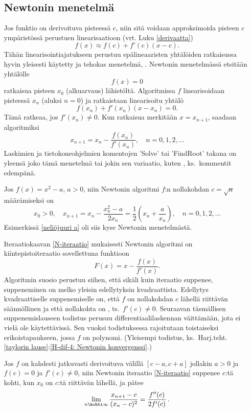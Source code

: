\subsection*{Newtonin menetelmä}

Jos funktio on derivoituva pisteessä $c$, niin sitä voidaan approksimoida pisteen $c$ 
ympäristössä perustuen linearisaatioon (vrt. Luku \ref{derivaatta})
\[
f(x)\approx f(c)+f'(c)(x-c).
\]
Tähän linearisointiajatukseen perustuu epälineaaristen yhtälöiden ratkaisussa hyvin yleisesti 
käytetty ja tehokas menetelmä, . Newtonin menetelmässä etsitään 
yhtälölle
\[
f(x)=0
\]
ratkaisua pisteen $x_0$ (alkuarvaus) lähistöltä. Algoritmissa $f$ linearisoidaan pisteessä $x_n$
(aluksi $n=0$) ja ratkaistaan linearisoitu yhtälö
\[
f(x_n)+f'(x_n)(x-x_n)=0.
\]
Tämä ratkeaa, jos $f'(x_n)\neq 0$. Kun ratkaisua merkitään $x=x_{n+1}$, saadaan algoritmiksi
\begin{equation} \label{N-iteraatio}
\boxed{\quad x_{n+1}=x_n-\frac{f(x_n)}{f'(x_n)},\quad n=0,1,2,\ldots \quad} \tag{$\star\star$}
\end{equation}
Laskimien ja tietokoneohjelmien komentojen 'Solve' tai 'FindRoot' takana on yleensä joko tämä
menetelmä tai jokin sen variaatio, kuten , ks.\ kommentit edempänä.
\begin{Exa} \label{neliöjuuri a - Newton} Jos $f(x)=x^2-a$, $a>0$, niin Newtonin algoritmi
$f$:n nollakohdan $c=\sqrt{a}$ määrämiseksi on
\[
x_0>0, \quad x_{n+1}=x_n-\frac{x_n^2-a}{2x_n}
                    =\frac{1}{2}\left(x_n+\frac{a}{x_n}\right),\quad n=0,1,2,\ldots
\]
Esimerkissä \ref{neliöjuuri a} oli siis kyse Newtonin menetelmästä. \loppu
\end{Exa}
Iteraatiokaavan \eqref{N-iteraatio} mukaisesti Newtonin algoritmi on kiintepistoiteraatio
sovellettuna funktioon
\[
F(x)=x-\frac{f(x)}{f'(x)}.
\]
Algoritmin suosio perustuu siihen, että sikäli kuin iteraatio suppenee, suppeneminen on melko
yleisin edellytyksin kvadraattista. Edellytys kvadraattiselle suppenemiselle on, että $f$
%
on nollakohdan $c$ lähellä riittävän säännöllinen ja että nollakohta on ,
ts.\ $f'(c) \neq 0$. Seuraavan täsmällisen suppenemislauseen todistus perusuu
differentiaalilaskennan väittämään, jota ei vielä ole käytettävissä. Sen vuoksi todistuksessa
rajoitutaan toistaiseksi erikoistapaukseen, jossa $f$ on polynomi. (Yleisempi todistus,
ks.\ Harj.teht.\,\ref{taylorin lause}:\ref{H-dif-4: Newtonin konvergenssi}.)
\begin{Lause} \label{Newtonin konvergenssi} Jos $f$ on kahdesti jatkuvasti derivoituva välillä 
$[c-a,c+a]$ jollakin $a>0$ ja $f(c)=0$ ja $f'(c)\neq 0$, niin Newtonin iteraatio 
\eqref{N-iteraatio} suppenee $c$:tä kohti, kun $x_0$ on $c$:tä riittävän lähellä, ja pätee
\[
\lim_{n \kohti \infty} \frac{x_{n+1}-c}{(x_n-c)^2} = \frac{f''(c)}{2f'(c)}\,.
\]
\end{Lause}
